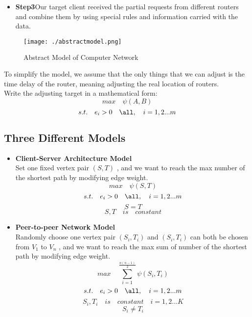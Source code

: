 \documentclass{elegantpaper}
\begin{document}
 \begin{itemize}[noitemsep]\item\textbf{Step3\quad }Our target client received the partial requests from different routers and combine them by using special rules and information carried with the data.
 \end{itemize}
  \begin{figure}[htbp]
	
	\centering
	
	\texttt{[image: ./abstractmodel.png]}
	
	\caption{Abstract Model of Computer Network}
	
\end{figure}
 To simplify the model, we assume that the only things that we can adjust is the time delay of the router, meaning adjusting the real location of routers.\\
 Write the adjusting target in a mathematical form:\\
 $$max \quad \psi(A,B) $$
 $$s.t. \quad e_i > 0 \quad \all,\quad i = 1,2...m$$

\subsection{Three Different Models}
\begin{itemize}[noitemsep]\item\textbf{Client-Server Architecture Model}\\
Set one fixed vertex pair $(S,T)$ , and we want to reach the max number of the shortest path by modifying edge weight.
 $$max \quad \psi(S,T) $$
 $$s.t. \quad e_i > 0 \quad \all,\quad i = 1,2...m$$
  $$S = T$$
 $$S,T \quad is\quad  constant$$
 \end{itemize}
 
  \begin{itemize}[noitemsep]\item\textbf{Peer-to-peer Network Model}\\
Randomly choose one vertex pair $(S_i,T_i)$ and $(S_i,T_i)$ can both be chosen from $V_1$ to $V_n$ , and we want to reach the max sum of number of the shortest path by modifying edge weight.
 $$max \quad \sum_{i=1}^{\frac{n(n-1)}{2}} \psi(S_i,T_i) $$
 $$s.t. \quad e_i > 0 \quad \all,\quad i = 1,2...m$$
 $$S_i,T_i \quad is\quad  constant \quad i=1,2...K$$
  $$S_i \ne T_i$$
 \end{itemize}
 
\end{document}
